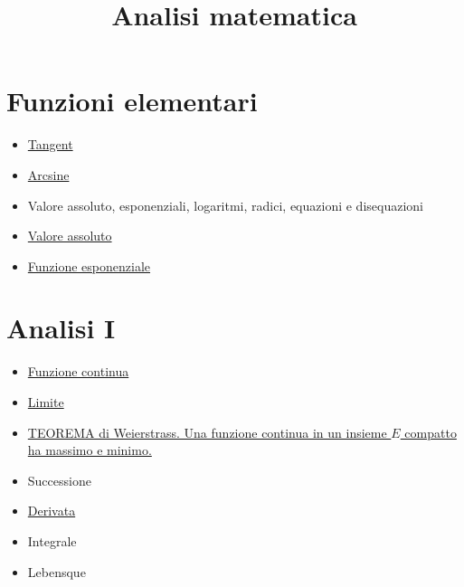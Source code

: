 \documentclass[a4paper,10pt]{article}
\title{Analisi matematica}
\author{}
\begin{document}
\maketitle
\section*{Funzioni elementari}
\begin{itemize}
 \item \href{Tangent.pdf}{Tangent}
 \item \href{Arcsine.pdf}{Arcsine}
 \item Valore assoluto, esponenziali, logaritmi, radici, equazioni e disequazioni
 \item \href{./ValoreAssoluto.pdf}{Valore assoluto}
 \item \href{./FunzioneEsponenziale.pdf}{Funzione esponenziale} 
\end{itemize}

\section{Analisi I}
\begin{itemize}
 \item \href{FunzioneContinua.pdf}{Funzione continua}
 \item \href{Limite.pdf}{Limite}
 \item \href{Weierstrass.pdf}{TEOREMA di Weierstrass. Una funzione continua in un insieme $E$ compatto ha massimo e minimo.}
 \item Successione
 \item \href{Derivata.pdf}{Derivata} 
 \item Integrale
 \item Lebensque
\end{itemize}
\end{document}
